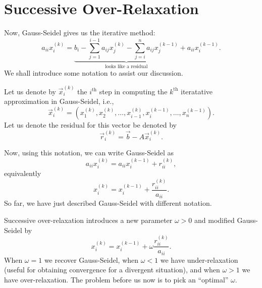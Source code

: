 \section{Successive Over-Relaxation}

Now, Gauss-Seidel gives us the iterative method:
\begin{equation}
a_{ii}x_{i}^{(k)}=\underbrace{b_{i}-\sum^{i-1}_{j=1}a_{ij}x^{(k)}_{j}-\sum^{n}_{j=i}a_{ij}x_{j}^{(k-1)}}_{\mbox{looks like a residual}}
+a_{ii}x_{i}^{(k-1)}.
\end{equation}
We shall introduce some notation to assist our discussion.

Let us denote by $\vec{x}_{i}^{(k)}$ the $i^{\text{th}}$ step in
computing the $k^{\text{th}}$ iteratative approximation in Gauss-Seidel,
i.e.,
\begin{equation}
\vec{x}_{i}^{(k)}=(x_{1}^{(k)}, x_{2}^{(k)},\dots, x_{i-1}^{(k)},
x_{i}^{(k-1)}, \dots, x_{n}^{(k-1)}).
\end{equation}
Let us denote the residual for this vector be denoted by
\begin{equation}
\vec{r}_{i}^{(k)}=\vec{b}-A\vec{x}_{i}^{(k)}.
\end{equation}

Now, using this notation, we can write Gauss-Seidel as
\begin{equation}
a_{ii}x^{(k)}_{i} = a_{ii}x^{(k-1)}_{i} + r_{ii}^{(k)},
\end{equation}
equivalently
\begin{equation}
x^{(k)}_{i} = x^{(k-1)}_{i} + \frac{r_{ii}^{(k)}}{a_{ii}}.
\end{equation}
So far, we have just described Gauss-Seidel with different notation.

Successive over-relaxation introduces a new parameter $\omega>0$ and
modified Gauss-Seidel by
\begin{equation}
x^{(k)}_{i} = x^{(k-1)}_{i} + \omega\frac{r_{ii}^{(k)}}{a_{ii}}.
\end{equation}
When $\omega=1$ we recover Gauss-Seidel, when $\omega<1$ we have
under-relaxation (useful for obtaining convergence for a divergent
situation), and when $\omega>1$ we have over-relaxation. The problem
before us now is to pick an ``optimal'' $\omega$.

